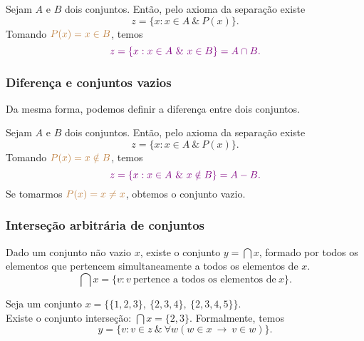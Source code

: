          Sejam $A$ e $B$ dois conjuntos. Então, pelo axioma da separação existe 
         $$z = \{x: x \in A\ \&\ P(x)\}.$$
         Tomando $\color{brown}{P(x) = x \in B}$, temos
         $$\color{violet}{z = \{x: x \in A\ \&\ x \in B \} = A \cap B}.$$

      \subsubsection*{Diferença e conjuntos vazios}
         Da mesma forma, podemos definir a diferença entre dois conjuntos.

         Sejam $A$ e $B$ dois conjuntos. Então, pelo axioma da separação existe 
         $$z = \{x: x \in A\ \&\ P(x)\}.$$
         Tomando $\color{brown}{P(x) = x \notin B}$, temos
         $$\color{violet}{z = \{x: x \in A\ \&\ x \notin B \} = A - B}.$$
         Se tomarmos $\color{brown}{P(x) = x \neq x}$, obtemos o conjunto vazio.

      \subsubsection*{Interseção arbitrária de conjuntos}
         \begin{theorem}
            Dado um conjunto não vazio $x$, existe o conjunto $y = \bigcap x$, formado por todos os elementos que pertencem simultaneamente a todos os elementos de $x$.
            $$\bigcap x = \{v: v\ \textrm{pertence a todos os elementos de}\ x\}.$$
         \end{theorem}
         \begin{exmp}
            Seja um conjunto $x = \{\{1,2,3\},\ \{2,3,4\},\ \{2,3,4,5\}\}.$\\
            Existe o conjunto interseção: $\bigcap x = \{2,3\}.$
            Formalmente, temos $$y = \{v: v \in z\ \&\ \forall w (w \in x\ \rightarrow\ v \in w)\}.$$
         \end{exmp}

